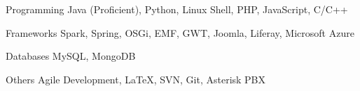 

\begin{cvskills}

  \cvskill
    {Programming} %
    {Java (Proficient), Python, Linux Shell, PHP, JavaScript, C/C++} %

  \cvskill
    {Frameworks} %
    {Spark, Spring, OSGi, EMF, GWT, Joomla, Liferay, Microsoft Azure} %

  \cvskill
    {Databases} %
    {MySQL, MongoDB} %


  \cvskill
  {Others} %
  {Agile Development, {\LaTeX}, SVN, Git, Asterisk PBX} %
  
\end{cvskills}

